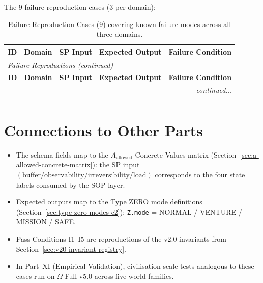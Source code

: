 The 9 failure-reproduction cases (3 per domain):

{\renewcommand{\arraystretch}{1.05}
\footnotesize
\begin{longtable}{@{}p{1.5cm}p{1.6cm}p{4.5cm}p{4.0cm}p{2.5cm}@{}}
\caption[Failure reproductions]{Failure Reproduction Cases (9)
covering known failure modes across all three domains.}
\label{tab:test-suite-failures} \\
\toprule
\textbf{ID} & \textbf{Domain} & \textbf{SP Input} &
\textbf{Expected Output} & \textbf{Failure Condition} \\
\midrule
\endfirsthead
\multicolumn{5}{l}{\itshape Failure Reproductions (continued)} \\
\toprule
\textbf{ID} & \textbf{Domain} & \textbf{SP Input} &
\textbf{Expected Output} & \textbf{Failure Condition} \\
\midrule
\endhead
\midrule
\multicolumn{5}{r}{\itshape continued$\ldots$} \\
\endfoot
\bottomrule
\endlastfoot


\end{longtable}
}

\section*{Connections to Other Parts}

\begin{itemize}
\item The schema fields map to the
$A_{\mathrm{allowed}}$ Concrete Values matrix
(Section~\ref{sec:a-allowed-concrete-matrix}): the SP input
$(\mathrm{buffer} / \mathrm{observability} / \mathrm{irreversibility}
/ \mathrm{load})$ corresponds to the four state labels consumed by
the SOP layer.
\item Expected outputs map to the Type ZERO mode definitions
(Section~\ref{sec:type-zero-modes-c2}):
\texttt{Z.mode} = NORMAL / VENTURE / MISSION / SAFE.
\item Pass Conditions I1--I5 are reproductions of the v2.0
invariants from
Section~\ref{sec:v20-invariant-registry}.
\item In Part~XI (Empirical Validation), civilisation-scale tests
analogous to these cases run on $\Omega$ Full v5.0 across five
world families.
\end{itemize}

